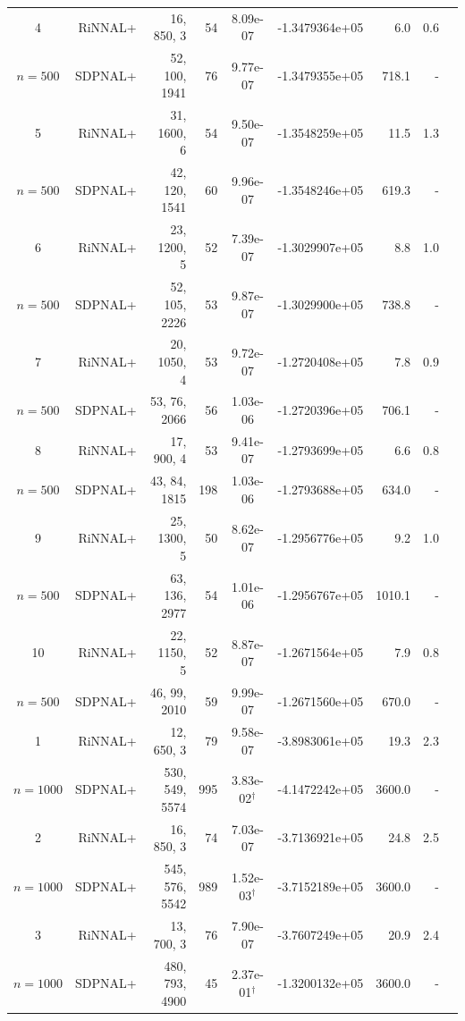 \documentclass[11pt]{article}
\theoremstyle{plain}
\begin{document}
\begin{footnotesize}
\begin{longtable}[c]{crrrccrrr}
4& RiNNAL+ & 16, 850, 3 & 54 & 8.09e-07 & -1.3479364e+05 & 6.0 &0.6 \\ 
$n=500$ & SDPNAL+ & 52, 100, 1941 & 76& 9.77e-07 & -1.3479355e+05 & 718.1 & - \\ [3pt] 

5& RiNNAL+ & 31, 1600, 6 & 54 & 9.50e-07 & -1.3548259e+05 & 11.5 &1.3 \\ 
$n=500$ & SDPNAL+ & 42, 120, 1541 & 60& 9.96e-07 & -1.3548246e+05 & 619.3 & - \\ [3pt] 

6& RiNNAL+ & 23, 1200, 5 & 52 & 7.39e-07 & -1.3029907e+05 & 8.8 &1.0 \\ 
$n=500$ & SDPNAL+ & 52, 105, 2226 & 53& 9.87e-07 & -1.3029900e+05 & 738.8 & - \\ [3pt] 

7& RiNNAL+ & 20, 1050, 4 & 53 & 9.72e-07 & -1.2720408e+05 & 7.8 &0.9 \\ 
$n=500$ & SDPNAL+ & 53, 76, 2066 & 56& 1.03e-06 & -1.2720396e+05 & 706.1 & - \\ [3pt] 

8& RiNNAL+ & 17, 900, 4 & 53 & 9.41e-07 & -1.2793699e+05 & 6.6 &0.8 \\ 
$n=500$ & SDPNAL+ & 43, 84, 1815 & 198& 1.03e-06 & -1.2793688e+05 & 634.0 & - \\ [3pt] 

9& RiNNAL+ & 25, 1300, 5 & 50 & 8.62e-07 & -1.2956776e+05 & 9.2 &1.0 \\ 
$n=500$ & SDPNAL+ & 63, 136, 2977 & 54& 1.01e-06 & -1.2956767e+05 & 1010.1 & - \\ [3pt] 

10& RiNNAL+ & 22, 1150, 5 & 52 & 8.87e-07 & -1.2671564e+05 & 7.9 &0.8 \\ 
$n=500$ & SDPNAL+ & 46, 99, 2010 & 59& 9.99e-07 & -1.2671560e+05 & 670.0 & - \\ [3pt] 

1& RiNNAL+ & 12, 650, 3 & 79 & 9.58e-07 & -3.8983061e+05 & 19.3 &2.3 \\ 
$n=1000$ & SDPNAL+ & 530, 549, 5574 & 995& 3.83e-02$^{\dagger}$ & -4.1472242e+05 & 3600.0 & - \\ [3pt] 

2& RiNNAL+ & 16, 850, 3 & 74 & 7.03e-07 & -3.7136921e+05 & 24.8 &2.5 \\ 
$n=1000$ & SDPNAL+ & 545, 576, 5542 & 989& 1.52e-03$^{\dagger}$ & -3.7152189e+05 & 3600.0 & - \\ [3pt] 

3& RiNNAL+ & 13, 700, 3 & 76 & 7.90e-07 & -3.7607249e+05 & 20.9 &2.4 \\ 
$n=1000$ & SDPNAL+ & 480, 793, 4900 & 45& 2.37e-01$^{\dagger}$ & -1.3200132e+05 & 3600.0 & - \\ [3pt] 


\end{longtable}
\end{footnotesize}
\end{document}
